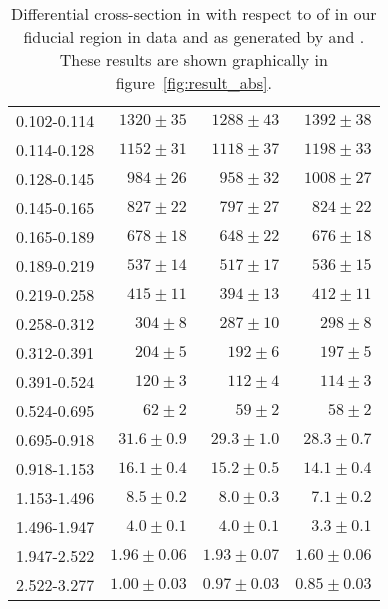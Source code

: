 \begin{table}
\begin{center}
\begin{tabular}{@{}l r r r@{}}
            0.102-0.114  &  $1320  \pm  35$    &  $1288  \pm  43$    &  $1392  \pm  38$    \\
            0.114-0.128  &  $1152  \pm  31$    &  $1118  \pm  37$    &  $1198  \pm  33$    \\
            0.128-0.145  &  $984   \pm  26$    &  $958   \pm  32$    &  $1008  \pm  27$    \\
            0.145-0.165  &  $827   \pm  22$    &  $797   \pm  27$    &  $824   \pm  22$    \\
            0.165-0.189  &  $678   \pm  18$    &  $648   \pm  22$    &  $676   \pm  18$    \\
            0.189-0.219  &  $537   \pm  14$    &  $517   \pm  17$    &  $536   \pm  15$    \\
            0.219-0.258  &  $415   \pm  11$    &  $394   \pm  13$    &  $412   \pm  11$    \\
            0.258-0.312  &  $304   \pm  8$     &  $287   \pm  10$    &  $298   \pm  8$     \\
            0.312-0.391  &  $204   \pm  5$     &  $192   \pm  6$     &  $197   \pm  5$     \\
            0.391-0.524  &  $120   \pm  3$     &  $112   \pm  4$     &  $114   \pm  3$     \\
            0.524-0.695  &  $62    \pm  2$     &  $59    \pm  2$     &  $58    \pm  2$     \\
            0.695-0.918  &  $31.6  \pm  0.9$   &  $29.3  \pm  1.0$   &  $28.3  \pm  0.7$   \\
            0.918-1.153  &  $16.1  \pm  0.4$   &  $15.2  \pm  0.5$   &  $14.1  \pm  0.4$   \\
            1.153-1.496  &  $8.5   \pm  0.2$   &  $8.0   \pm  0.3$   &  $7.1   \pm  0.2$   \\
            1.496-1.947  &  $4.0   \pm  0.1$   &  $4.0   \pm  0.1$   &  $3.3   \pm  0.1$   \\
            1.947-2.522  &  $1.96  \pm  0.06$  &  $1.93  \pm  0.07$  &  $1.60  \pm  0.06$  \\
            2.522-3.277  &  $1.00  \pm  0.03$  &  $0.97  \pm  0.03$  &  $0.85  \pm  0.03$  \\
            \bottomrule
        \end{tabular}
    \end{center}
    \caption[
        Differential cross-section in \pb with respect to \phistar of \Ztoee.
    ]{
        Differential cross-section in \pb with respect to \phistar of \Ztoee in
        our fiducial region in data and as generated by \MADGRAPH and \POWHEG.
        These results are shown graphically in figure~\ref{fig:result_abs}.
    }
    \label{tab:results_abs}
\end{table}
